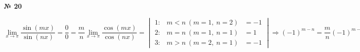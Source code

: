 \documentclass{article}
\begin{document}
\textbf{№ 20} 

$$ \lim\limits_{x\to \pi} \frac{\sin{(mx)}}{\sin{(nx)}}
= \frac{0}{0}
= \frac{m}{n} \lim\limits_{x\to \pi} \frac{\cos{(mx)}}{\cos{(nx)}}
= \begin{vmatrix} 1: & m<n \ (m=1, \ n=2) & = -1 \\
                  2: & m=n \ (m=1, \ n=1) & = 1 \\
                  3: & m>n \ (m=2, \ n=1) & = -1 \end{vmatrix} 
\Rightarrow (-1)^{m-n} 
= \frac{m}{n} (-1)^{m-n} $$
\end{document}
